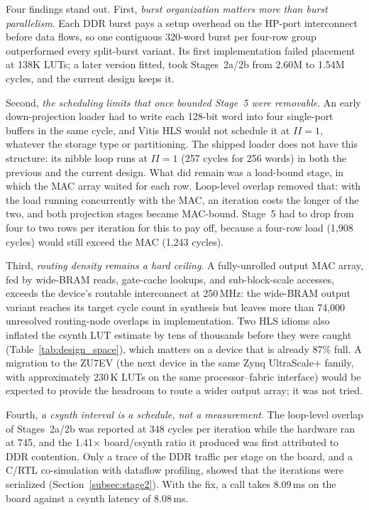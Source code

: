 Four findings stand out. First, \emph{burst organization matters more than burst
parallelism}. Each DDR burst pays a setup overhead on the HP-port interconnect before
data flows, so one contiguous 320-word burst per four-row group outperformed every
split-burst variant. Its first implementation failed placement at 138K LUTs; a later
version fitted, took Stages~2a/2b from 2.60M to 1.54M cycles, and the current design
keeps it.

Second, \emph{the scheduling limits that once bounded Stage~5 were removable}. An early
down-projection loader had to write each 128-bit word into four single-port buffers in
the same cycle, and Vitis HLS would not schedule it at $II=1$, whatever the storage type
or partitioning. The shipped loader does not have this structure: its nibble loop runs at
$II=1$ (257 cycles for 256 words) in both the previous and the current design. What did
remain was a load-bound stage, in which the MAC array waited for each row. Loop-level
overlap removed that: with the load running concurrently with the MAC, an iteration
costs the longer of the two, and both projection stages became MAC-bound. Stage~5 had
to drop from four to two rows per iteration for this to pay off, because a four-row load
(1,908 cycles) would still exceed the MAC (1,243 cycles).

Third, \emph{routing density remains a hard ceiling}. A fully-unrolled output MAC array,
fed by wide-BRAM reads, gate-cache lookups, and sub-block-scale accesses, exceeds the
device's routable interconnect at 250\,MHz: the wide-BRAM output variant reaches its
target cycle count in synthesis but leaves more than 74,000 unresolved routing-node
overlaps in implementation. Two HLS idioms also inflated the csynth LUT estimate by
tens of thousands before they were caught (Table~\ref{tab:design_space}), which matters on a
device that is already 87\% full. A migration to the ZU7EV (the next device in the same
Zynq UltraScale+ family, with approximately 230\,K LUTs on the same processor--fabric
interface) would be expected to provide the headroom to route a wider output array; it
was not tried.

Fourth, \emph{a csynth interval is a schedule, not a measurement}. The loop-level overlap
of Stages~2a/2b was reported at 348 cycles per iteration while the hardware ran at 745,
and the 1.41$\times$ board/csynth ratio it produced was first attributed to DDR
contention. Only a trace of the DDR traffic per stage on the board, and a C/RTL
co-simulation with dataflow profiling, showed that the iterations were serialized
(Section~\ref{subsec:stage2}). With the fix, a call takes 8.09\,ms on the board against
a csynth latency of 8.08\,ms.

